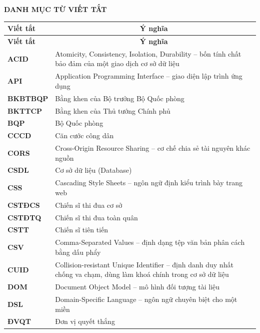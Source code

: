 \documentclass[../DoAn.tex]{subfiles}
\begin{document}
\begin{center}
    \Large{\textbf{DANH MỤC TỪ VIẾT TẮT}}
\end{center}
\vspace{0.6cm}

\renewcommand{\arraystretch}{1.25}
\begin{longtable}{|>{\centering\arraybackslash}p{3.2cm}|p{10.8cm}|}
\hline
\textbf{Viết tắt} & \multicolumn{1}{c|}{\textbf{Ý nghĩa}} \\ \hline
\endfirsthead
\hline
\textbf{Viết tắt} & \multicolumn{1}{c|}{\textbf{Ý nghĩa}} \\ \hline
\endhead
\hline
\endfoot
\textbf{ACID}     & Atomicity, Consistency, Isolation, Durability -- bốn tính chất bảo đảm của một giao dịch cơ sở dữ liệu \\ \hline
\textbf{API}      & Application Programming Interface -- giao diện lập trình ứng dụng \\ \hline
\textbf{BKBTBQP}  & Bằng khen của Bộ trưởng Bộ Quốc phòng \\ \hline
\textbf{BKTTCP}   & Bằng khen của Thủ tướng Chính phủ \\ \hline
\textbf{BQP}      & Bộ Quốc phòng \\ \hline
\textbf{CCCD}     & Căn cước công dân \\ \hline
\textbf{CORS}     & Cross-Origin Resource Sharing -- cơ chế chia sẻ tài nguyên khác nguồn \\ \hline
\textbf{CSDL}     & Cơ sở dữ liệu (Database) \\ \hline
\textbf{CSS}      & Cascading Style Sheets -- ngôn ngữ định kiểu trình bày trang web \\ \hline
\textbf{CSTĐCS}   & Chiến sĩ thi đua cơ sở \\ \hline
\textbf{CSTĐTQ}   & Chiến sĩ thi đua toàn quân \\ \hline
\textbf{CSTT}     & Chiến sĩ tiên tiến \\ \hline
\textbf{CSV}      & Comma-Separated Values -- định dạng tệp văn bản phân cách bằng dấu phẩy \\ \hline
\textbf{CUID}     & Collision-resistant Unique Identifier -- định danh duy nhất chống va chạm, dùng làm khoá chính trong cơ sở dữ liệu \\ \hline
\textbf{DOM}      & Document Object Model -- mô hình đối tượng tài liệu \\ \hline
\textbf{DSL}      & Domain-Specific Language -- ngôn ngữ chuyên biệt cho một miền \\ \hline
\textbf{ĐVQT}     & Đơn vị quyết thắng \\ \hline

\end{longtable}
\end{document}
